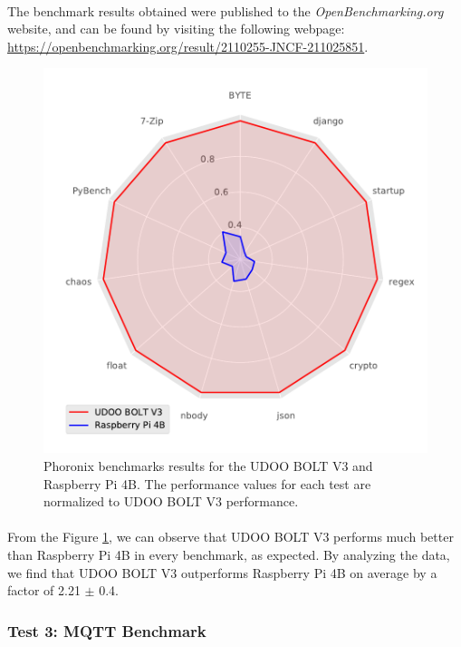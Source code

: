 \paragraph{} The benchmark results obtained were published to the \textit{OpenBenchmarking.org} website, and can be found by visiting the following webpage: \url{https://openbenchmarking.org/result/2110255-JNCF-211025851}.
\begin{figure}[H]
    \centering
    \includegraphics[width=0.8 \linewidth]{images/phoronix-benchmarks.pdf}
    \caption [Phoronix benchmarks results for the UDOO BOLT V3 and Raspberry Pi 4B.]{ Phoronix benchmarks results for the UDOO BOLT V3 and Raspberry Pi 4B. The performance values for each test are normalized to UDOO BOLT V3 performance.}
    \label{fig:phronix-benchmarks}
\end{figure}

\paragraph{} From the Figure \ref{fig:phronix-benchmarks}, we can observe that UDOO BOLT V3 performs much better than Raspberry Pi 4B in every benchmark, as expected. By analyzing the data, we find that UDOO BOLT V3 outperforms Raspberry Pi 4B on average by a factor of 2.21 $\pm$ 0.4.

\subsubsection{Test 3: \acs{MQTT} Benchmark}

